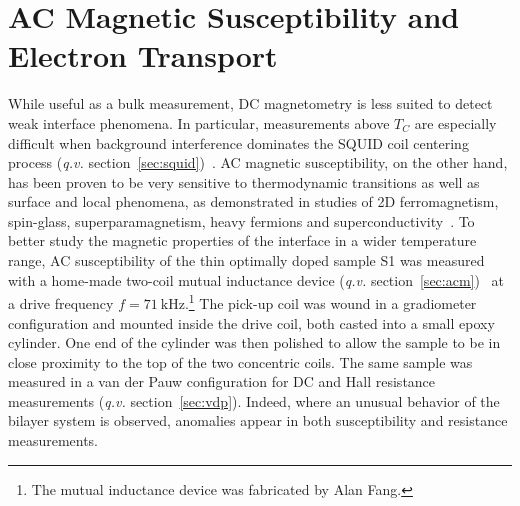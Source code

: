 \FloatBarrier%
\section{AC Magnetic Susceptibility and Electron Transport}
While useful as a bulk measurement, DC magnetometry is less suited to detect weak interface phenomena. In particular, measurements above $T_C$ are especially difficult when background interference dominates the SQUID coil centering process (\textit{q.v.} section~\ref{sec:squid})~\cite{squid_center_error}. AC magnetic susceptibility, on the other hand, has been proven to be very sensitive to thermodynamic transitions as well as surface and local phenomena, as demonstrated in studies of 2D ferromagnetism, spin-glass, superparamagnetism, heavy fermions and superconductivity~\cite{ac_nitroxide, ac_spin_glass, ac_superpara, Ando1994, Gegenwart2005, Schemm2014}. To better study the magnetic properties of the interface in a wider temperature range, AC susceptibility of the thin optimally doped sample S1 was measured with a home-made two-coil mutual inductance device (\textit{q.v.} section~\ref{sec:acm})~\cite{Jeanneret1989,Yazdani1993} at a drive frequency $f=71~\mathrm{kHz}$.\footnote{The mutual inductance device was fabricated by Alan Fang.} The pick-up coil was wound in a gradiometer configuration and mounted inside the drive coil, both casted into a small epoxy cylinder. One end of the cylinder was then polished to allow the sample to be in close proximity to the top of the two concentric coils. The same sample was measured in a van der Pauw configuration for DC and Hall resistance measurements (\textit{q.v.} section~\ref{sec:vdp}). Indeed, where an unusual behavior of the bilayer system is observed, anomalies appear in both susceptibility and resistance measurements.

